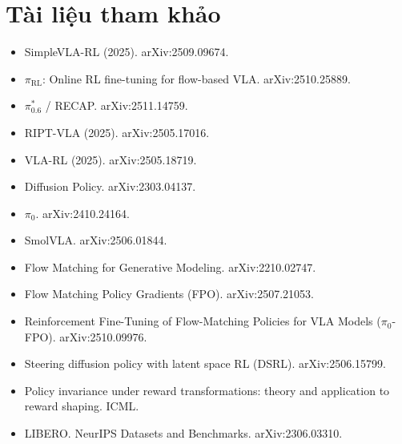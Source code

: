 \documentclass[9pt,a4paper]{extarticle}
\begin{document}
\section*{Tài liệu tham khảo}
{\scriptsize\raggedright
\begin{itemize}
\item SimpleVLA-RL (2025). arXiv:2509.09674.
\item $\pi_{\text{RL}}$: Online RL fine-tuning for flow-based VLA. arXiv:2510.25889.
\item $\pi^*_{0.6}$ / RECAP. arXiv:2511.14759.
\item RIPT-VLA (2025). arXiv:2505.17016.
\item VLA-RL (2025). arXiv:2505.18719.
\item Diffusion Policy. arXiv:2303.04137.
\item $\pi_0$. arXiv:2410.24164.
\item SmolVLA. arXiv:2506.01844.
\item Flow Matching for Generative Modeling. arXiv:2210.02747.
\item Flow Matching Policy Gradients (FPO). arXiv:2507.21053.
\item Reinforcement Fine-Tuning of Flow-Matching Policies for VLA Models ($\pi_0$-FPO). arXiv:2510.09976.
\item Steering diffusion policy with latent space RL (DSRL). arXiv:2506.15799.
\item Policy invariance under reward transformations: theory and application to reward shaping. ICML.
\item LIBERO. NeurIPS Datasets and Benchmarks. arXiv:2306.03310.
\end{itemize}}
\end{document}
